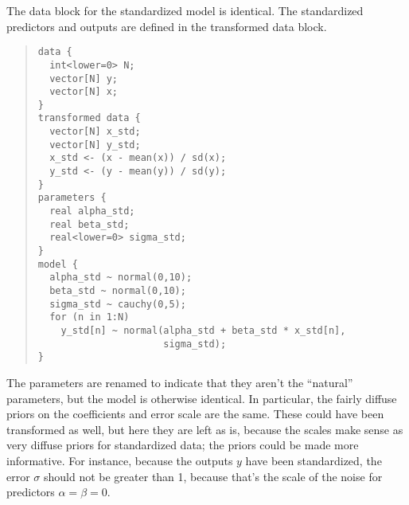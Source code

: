 The data block for the standardized model is identical.  The
standardized predictors and outputs are defined in the transformed
data block.  
%
\begin{quote}
\begin{Verbatim}[fontsize=\small]
data {
  int<lower=0> N;
  vector[N] y;
  vector[N] x;
}
transformed data {
  vector[N] x_std;
  vector[N] y_std;
  x_std <- (x - mean(x)) / sd(x);
  y_std <- (y - mean(y)) / sd(y);
}
parameters {
  real alpha_std;
  real beta_std;
  real<lower=0> sigma_std;
}
model {
  alpha_std ~ normal(0,10);    
  beta_std ~ normal(0,10);
  sigma_std ~ cauchy(0,5);
  for (n in 1:N)
    y_std[n] ~ normal(alpha_std + beta_std * x_std[n], 
                      sigma_std);
}
\end{Verbatim}
\end{quote}
%
The parameters are renamed to indicate that they aren't the
``natural'' parameters, but the model is otherwise identical.  In
particular, the fairly diffuse priors on the coefficients and error
scale are the same.  These could have been transformed as well, but
here they are left as is, because the scales make sense as very
diffuse priors for standardized data; the priors could be made more
informative.  For instance, because the outputs $y$ have been
standardized, the error $\sigma$ should not be greater than 1, because
that's the scale of the noise for predictors $\alpha = \beta = 0$.

